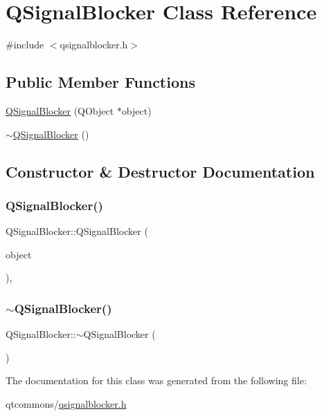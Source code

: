 \hypertarget{class_q_signal_blocker}{}\section{Q\+Signal\+Blocker Class Reference}
\label{class_q_signal_blocker}


{\ttfamily \#include $<$qsignalblocker.\+h$>$}

\subsection*{Public Member Functions}
\begin{DoxyCompactItemize}
\item 
\mbox{\hyperlink{class_q_signal_blocker_ab1ff2e04c6443ec39bf621db2257588c}{Q\+Signal\+Blocker}} (Q\+Object $\ast$object)
\item 
\mbox{\hyperlink{class_q_signal_blocker_af6a6d844860e185c6516235a583c9a03}{$\sim$\+Q\+Signal\+Blocker}} ()
\end{DoxyCompactItemize}


\subsection{Constructor \& Destructor Documentation}
\mbox{\label{class_q_signal_blocker_ab1ff2e04c6443ec39bf621db2257588c}} 
\subsubsection{\texorpdfstring{QSignalBlocker()}{QSignalBlocker()}}
{\footnotesize\ttfamily Q\+Signal\+Blocker\+::\+Q\+Signal\+Blocker (\begin{DoxyParamCaption}\item[{Q\+Object $\ast$}]{object }\end{DoxyParamCaption})\hspace{0.3cm}{\ttfamily [inline]}, {\ttfamily [explicit]}}

\mbox{\label{class_q_signal_blocker_af6a6d844860e185c6516235a583c9a03}} 
\subsubsection{\texorpdfstring{$\sim$QSignalBlocker()}{~QSignalBlocker()}}
{\footnotesize\ttfamily Q\+Signal\+Blocker\+::$\sim$\+Q\+Signal\+Blocker (\begin{DoxyParamCaption}{ }\end{DoxyParamCaption})\hspace{0.3cm}{\ttfamily [inline]}}



The documentation for this class was generated from the following file\+:\begin{DoxyCompactItemize}
\item 
qtcommons/\mbox{\hyperlink{qsignalblocker_8h}{qsignalblocker.\+h}}\end{DoxyCompactItemize}
